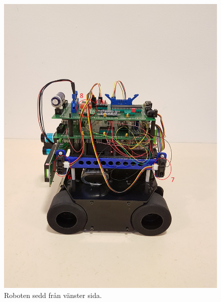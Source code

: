 \documentclass{article}
\begin{document}
\clearpage
\begin{figure}[H]
\centering
\includegraphics[scale=0.1]{robot_left_side}
\caption{Roboten sedd från vänster sida.}
\label{fig:robot_left_side}
\end{figure}
\end{document}
